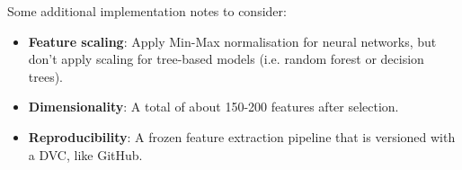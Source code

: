 \noindent Some additional implementation notes to consider: 

\begin{itemize}
  \item \textbf{Feature scaling}: Apply Min-Max normalisation for neural networks, but don't apply scaling for tree-based models (i.e. random forest or decision trees).
  \item \textbf{Dimensionality}: A total of about 150-200 features after selection.
  \item \textbf{Reproducibility}: A frozen feature extraction pipeline that is versioned with a DVC, like GitHub.
\end{itemize}
